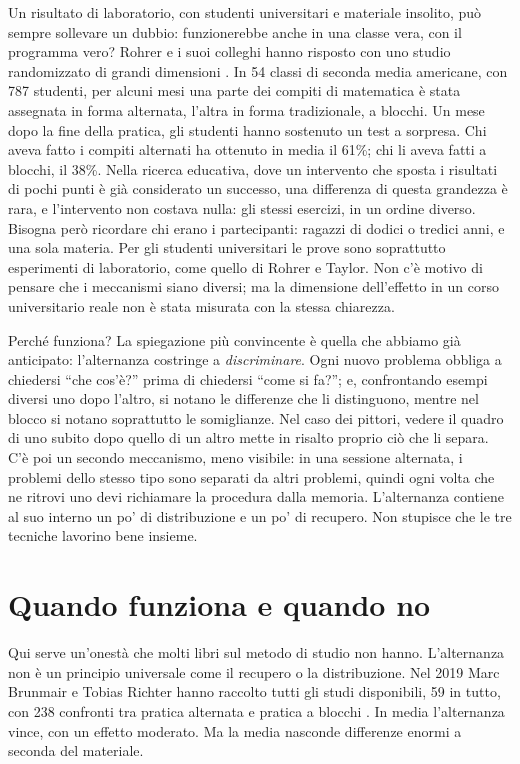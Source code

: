 Un risultato di laboratorio, con studenti universitari e materiale
insolito, può sempre sollevare un dubbio: funzionerebbe anche in una
classe vera, con il programma vero? Rohrer e i suoi colleghi hanno
risposto con uno studio randomizzato di grandi dimensioni
\parencite{rohrer2020}. In 54 classi di seconda media americane, con
787 studenti, per alcuni mesi una parte dei compiti di matematica è
stata assegnata in forma alternata, l'altra in forma tradizionale, a
blocchi. Un mese dopo la fine della pratica, gli studenti hanno
sostenuto un test a sorpresa. Chi aveva fatto i compiti alternati ha
ottenuto in media il 61\%; chi li aveva fatti a blocchi, il 38\%. Nella
ricerca educativa, dove un intervento che sposta i risultati di pochi
punti è già considerato un successo, una differenza di questa grandezza
è rara, e l'intervento non costava nulla: gli stessi esercizi, in un
ordine diverso. Bisogna però ricordare chi erano i partecipanti:
ragazzi di dodici o tredici anni, e una sola materia. Per gli
studenti universitari le prove sono soprattutto esperimenti di
laboratorio, come quello di Rohrer e Taylor. Non c'è motivo di
pensare che i meccanismi siano diversi; ma la dimensione dell'effetto
in un corso universitario reale non è stata misurata con la stessa
chiarezza.

Perché funziona? La spiegazione più convincente è quella che abbiamo
già anticipato: l'alternanza costringe a \emph{discriminare}. Ogni
nuovo problema obbliga a chiedersi \enquote{che cos'è?} prima di
chiedersi \enquote{come si fa?}; e, confrontando esempi diversi uno
dopo l'altro, si notano le differenze che li distinguono, mentre nel
blocco si notano soprattutto le somiglianze. Nel caso dei pittori,
vedere il quadro di uno subito dopo quello di un altro mette in risalto
proprio ciò che li separa. C'è poi un secondo meccanismo, meno visibile: in una
sessione alternata, i problemi dello stesso tipo sono separati da altri
problemi, quindi ogni volta che ne ritrovi uno devi richiamare la
procedura dalla memoria. L'alternanza contiene al suo interno un po' di
distribuzione e un po' di recupero. Non stupisce che le tre tecniche
lavorino bene insieme.

\section{Quando funziona e quando no}

Qui serve un'onestà che molti libri sul metodo di studio non hanno.
L'alternanza non è un principio universale come il recupero o la
distribuzione. Nel 2019 Marc Brunmair e Tobias Richter hanno raccolto
tutti gli studi disponibili, 59 in tutto, con 238 confronti tra
pratica alternata e pratica a blocchi \parencite{brunmair2019}. In
media l'alternanza vince, con un effetto moderato. Ma la media nasconde
differenze enormi a seconda del materiale.

